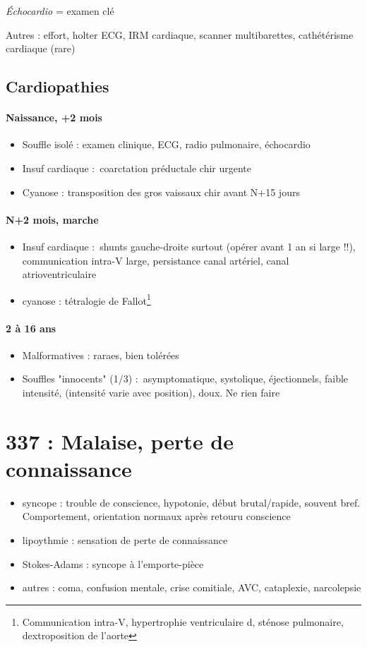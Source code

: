 \documentclass{article}
\begin{document}
\textit{Échocardio} = examen clé

Autres : effort, holter ECG, IRM cardiaque, scanner multibarettes, cathétérisme
cardiaque (rare)

\subsection{Cardiopathies}
\paragraph{Naissance, +2 mois}
\begin{itemize}
  \item Souffle isolé : examen clinique, ECG, radio pulmonaire, échocardio
  \item Insuf cardiaque : coarctation préductale \thus chir urgente
  \item Cyanose : transposition des gros vaissaux \thus chir avant N+15 jours
\end{itemize}

\paragraph{N+2 mois, marche}
\begin{itemize}
  \item Insuf cardiaque : shunts gauche-droite surtout (\thus opérer avant 1 an
    si large !!), communication intra-V
    large, persistance canal artériel, canal atrioventriculaire
  \item cyanose : tétralogie de Fallot\footnote{Communication intra-V,
      hypertrophie ventriculaire d, sténose pulmonaire, dextroposition de
    l'aorte}
\end{itemize}
\paragraph{2 à 16 ans}
\begin{itemize}
  \item Malformatives : raraes, bien tolérées
  \item Souffles "innocents" (1/3) : asymptomatique, systolique, éjectionnels,
    faible intensité, (intensité varie avec position), doux. Ne rien faire
\end{itemize}




\section{337 : Malaise, perte de connaissance}%
\label{sec:337_malaise_perte_de_connaissance}
\begin{itemize}
  \item syncope : trouble de conscience, hypotonie, début brutal/rapide, souvent
    bref. Comportement, orientation normaux après retouru conscience
  \item lipoythmie : sensation de perte de connaissance
  \item Stokes-Adams : syncope à l'emporte-pièce
  \item autres : coma, confusion mentale, crise comitiale, AVC, cataplexie,
    narcolepsie
\end{itemize}
\end{document}
